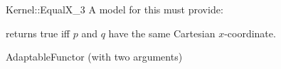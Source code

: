 \begin{ccRefFunctionObjectConcept}{Kernel::EqualX_3}
A model for this must provide:


{returns true iff $p$ and $q$ have the same Cartesian $x$-coordinate.}

\ccRefines
AdaptableFunctor (with two arguments)

\ccSeeAlso
{}\\

\end{ccRefFunctionObjectConcept}
